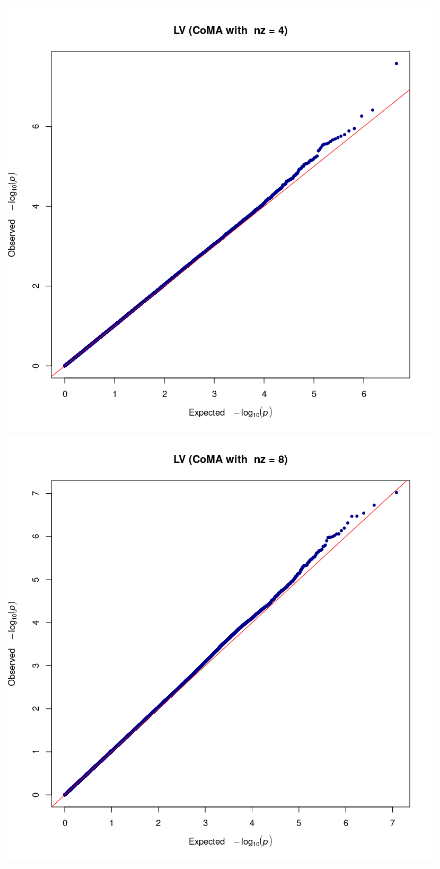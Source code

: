 \documentclass[twocolumn]{llncs}
\begin{document}
\begin{figure}
\includegraphics[width=\linewidth]{figs/gwas/2020-04-24_11_03_10_723719__LV__nz__4__gwas__qqplot__inv_norm__GBR.png}
\includegraphics[width=\linewidth]{figs/gwas/2020-04-26_07_36_30_873605__LV__nz__8__gwas__qqplot__inv_norm__GBR.png}

\end{figure}
\end{document}

